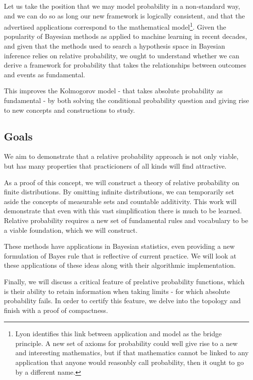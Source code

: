 \documentclass[twoside]{article}
\theoremstyle{plain}%
\theoremstyle{definition}
\theoremstyle{remark}
\begin{document}
Let us take the position that we may model probability in a non-standard way, and we can do so as long our new framework is logically consistent, and that the advertised applications correspond to the mathematical model\footnote{Lyon identifies this link between application and model as the bridge principle. A new set of axioms for probability could well give rise to a new and interesting mathematics, but if that mathematics cannot be linked to any application that anyone would reasonbly call probability, then it ought to go by a different name.}. Given the popularity of Bayesian methods as applied to machine learning in recent decades, and given that the methods used to search a hypothesis space in Bayesian inference relies on relative probability\cite{sklar_bias}, we ought to understand whether we can derive a framework for probability that takes the relationships between outcomes and events as fundamental.

This improves the Kolmogorov model - that takes absolute probability as fundamental - by both solving the conditional probability question and giving rise to new concepts and constructions to study.

\subsection{Goals}

We aim to demonstrate that a relative probability approach is not only viable, but has many properties that practicioners of all kinds will find attractive.

As a proof of this concept, we will construct a theory of relative probability on finite distributions. By omitting infinite distributions, we can temporarily set aside the concepts of measurable sets and countable additivity. This work will demonstrate that even with this vast simplification there is much to be learned. Relative probability requires a new set of fundamental rules and vocabulary to be a viable foundation, which we will construct.

These methods have applications in Bayesian statistics, even providing a new formulation of Bayes rule that is reflective of current practice. We will look at these applications of these ideas along with their algorithmic implementation.

Finally, we will discuss a critical feature of prelative probability functions, which is their ability to retain information when taking limits - for which absolute probability fails. In order to certify this feature, we delve into the topology and finish with a proof of compactness.
\end{document}
